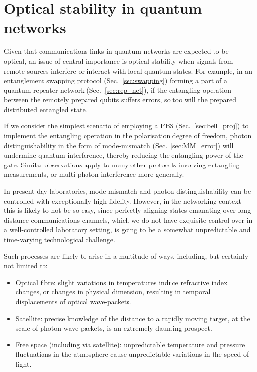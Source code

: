 %
%

\section{Optical stability in quantum networks} \label{sec:opt_stab} 

Given that communications links in quantum networks are expected to be optical, an issue of central importance is optical stability when signals from remote sources interfere or interact with local quantum states. For example, in an entanglement swapping protocol (Sec.~\ref{sec:swapping}) forming a part of a quantum repeater network (Sec.~\ref{sec:rep_net}), if the entangling operation between the remotely prepared qubits suffers errors, so too will the prepared distributed entangled state.

If we consider the simplest scenario of employing a PBS (Sec.~\ref{sec:bell_proj}) to implement the entangling operation in the polarisation degree of freedom, photon distinguishability in the form of mode-mismatch (Sec.~\ref{sec:MM_error}) will undermine quantum interference, thereby reducing the entangling power of the gate. Similar observations apply to many other protocols involving entangling measurements, or multi-photon interference more generally.

In present-day laboratories, mode-mismatch and photon-distinguishability can be controlled with exceptionally high fidelity. However, in the networking context this is likely to not be so easy, since perfectly aligning states emanating over long-distance communications channels, which we do not have exquisite control over in a well-controlled laboratory setting, is going to be a somewhat unpredictable and time-varying technological challenge.

Such processes are likely to arise in a multitude of ways, including, but certainly not limited to:
\begin{itemize}
	\item Optical fibre: slight variations in temperatures induce refractive index changes, or changes in physical dimension, resulting in temporal displacements of optical wave-packets.
	\item Satellite: precise knowledge of the distance to a rapidly moving target, at the scale of photon wave-packets, is an extremely daunting prospect.
	\item Free space (including via satellite): unpredictable temperature and pressure fluctuations in the atmosphere cause unpredictable variations in the speed of light.
\end{itemize}

